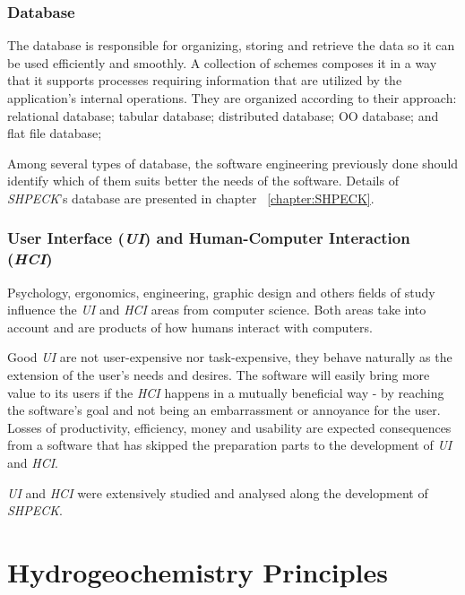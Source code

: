 \documentclass[ppgc,mestrado,english]{iiufrgs}
\begin{document}
\subsubsection{Database}
The database is responsible for organizing, storing and retrieve the data so it can be used efficiently and smoothly. A collection of schemes composes it in a way that it supports processes requiring information that are utilized by the application's internal operations. They are organized according to their approach: relational database; tabular database; distributed database; OO database; and flat file database;

Among several types of database, the software engineering previously done should identify which of them suits better the needs of the software. Details of \emph{SHPECK}'s database are presented in chapter ~\ref{chapter:SHPECK}.

\subsubsection{User Interface (\emph{UI}) and Human-Computer Interaction (\emph{HCI})}
Psychology, ergonomics, engineering, graphic design and others fields of study influence the \emph{UI} and \emph{HCI} areas from computer science. Both areas take into account and are products of how humans interact with computers.

Good \emph{UI} are not user-expensive nor task-expensive, they behave naturally as the extension of the user's needs and desires. The software will easily bring more value to its users if the \emph{HCI} happens in a mutually beneficial way - by reaching the software's goal and not being an embarrassment or annoyance for the user. Losses of productivity, efficiency, money and usability are expected consequences from a software that has skipped the preparation parts to the development of \emph{UI} and \emph{HCI}.

\emph{UI} and \emph{HCI} were extensively studied and analysed along the development of \emph{SHPECK}.

\section{Hydrogeochemistry Principles}
\end{document}

